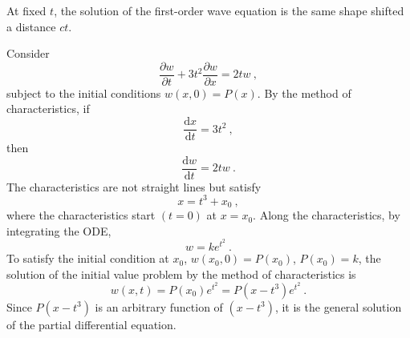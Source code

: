 \documentclass[12pt,a4paper]{article}
\newcommand{\dif}{\mathrm{d}}
\begin{document}
At fixed $t$, the solution of the first-order wave equation is the same shape shifted a distance $ct$. 

Consider
\begin{equation}
\dfrac{\partial w}{\partial t} + 3t^2 \dfrac{\partial w}{\partial x} = 2t w ~,
\end{equation}
subject to the initial conditions $w(x, 0) = P(x)$. By the method of characteristics, if
\begin{equation}
\dfrac{\dif x}{\dif t} = 3t^2 ~,
\end{equation}
then 
\begin{equation}
\dfrac{\dif w}{\dif t} = 2 tw ~.
\end{equation}
The characteristics are not straight lines but satisfy
\begin{equation}
x = t^3 +x_0 ~,
\end{equation}
where the characteristics start $(t = 0)$ at $x = x_0$. Along the characteristics, by integrating the ODE, 
\begin{equation}
w = k e^{t^2} ~.
\end{equation}
To satisfy the initial condition at $x_0$, $w(x_0, 0) = P(x_0)$, $P(x_0) = k$, the solution of the initial value problem by the method of characteristics is
\begin{equation}
w(x, t) = P(x_0) e^{t^2} = P(x-t^3) e^{t^2} ~.
\end{equation}
Since $P(x - t^3)$ is an arbitrary function of $(x - t^3)$, it is the general solution of the partial differential equation. 
\end{document}
